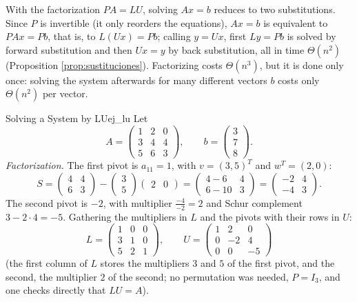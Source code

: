 \documentclass[11pt, a4paper]{article}
\begin{document}
With the factorization $PA = LU$, solving $Ax = b$ reduces to two substitutions. Since $P$ is invertible (it only reorders the equations), $Ax = b$ is equivalent to $PAx = Pb$, that is, to $L(Ux) = Pb$; calling $y = Ux$, first $Ly = Pb$ is solved by forward substitution and then $Ux = y$ by back substitution, all in time $\Theta(n^2)$ (Proposition \ref{prop:sustituciones}). Factorizing costs $\Theta(n^3)$, but it is done only once: solving the system afterwards for many different vectors $b$ costs only $\Theta(n^2)$ per vector.

\begin{ejemplo}{Solving a System by LU}{ej_lu}
Let
\[
A = \begin{pmatrix} 1 & 2 & 0 \\ 3 & 4 & 4 \\ 5 & 6 & 3 \end{pmatrix}, \qquad b = \begin{pmatrix} 3 \\ 7 \\ 8 \end{pmatrix}.
\]
\textit{Factorization.} The first pivot is $a_{11} = 1$, with $v = (3, 5)^T$ and $w^T = (2, 0)$:
\[
S = \begin{pmatrix} 4 & 4 \\ 6 & 3 \end{pmatrix} - \begin{pmatrix} 3 \\ 5 \end{pmatrix} \begin{pmatrix} 2 & 0 \end{pmatrix}
= \begin{pmatrix} 4 - 6 & 4 \\ 6 - 10 & 3 \end{pmatrix} = \begin{pmatrix} -2 & 4 \\ -4 & 3 \end{pmatrix}.
\]
The second pivot is $-2$, with multiplier $\frac{-4}{-2} = 2$ and Schur complement $3 - 2 \cdot 4 = -5$. Gathering the multipliers in $L$ and the pivots with their rows in $U$:
\[
L = \begin{pmatrix} 1 & 0 & 0 \\ 3 & 1 & 0 \\ 5 & 2 & 1 \end{pmatrix}, \qquad
U = \begin{pmatrix} 1 & 2 & 0 \\ 0 & -2 & 4 \\ 0 & 0 & -5 \end{pmatrix}
\]
(the first column of $L$ stores the multipliers $3$ and $5$ of the first pivot, and the second, the multiplier $2$ of the second; no permutation was needed, $P = I_3$, and one checks directly that $LU = A$).


\end{ejemplo}
\end{document}
